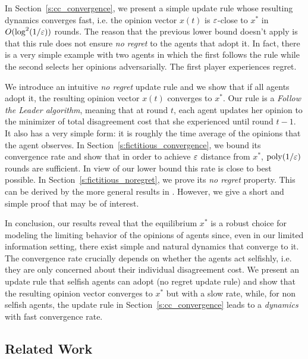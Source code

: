 In Section~\ref{s:cc_convergence}, we present a simple update rule
whose resulting dynamics converges fast, i.e.
the opinion vector $x(t)$ is $\varepsilon$-close to $x^*$ in
$O(\log^2 (1/\varepsilon))$ rounds. The reason that the previous lower
bound doesn't apply is that this rule does not ensure \emph{no regret}
to the agents that adopt it. In fact, there is a very
simple example with two agents in which the first follows the rule
while the second selects her opinions adversarially.  The first player
experiences regret.

We introduce an intuitive \emph{no regret} update rule and we
show that if all agents adopt it, the resulting opinion vector $x(t)$
converges to $x^*$.  Our rule is a \emph{Follow the Leader algorithm}, meaning
that at round $t$, each agent updates her opinion to the minimizer of total
disagreement cost that she experienced until round $t-1$.  It also has a very
simple form: it is roughly the time average of the opinions that the agent
observes.  In Section~\ref{s:fictitious_convergence}, we bound its convergence
rate and show that in order to achieve $\varepsilon$ distance from $x^*$,
$\mathrm{poly}(1/\varepsilon)$ rounds are sufficient.  In view of our lower bound this rate
is close to best possible.  In Section~\ref{s:fictitious_noregret}, we prove its
\emph{no regret} property. This can be derived by the more general results
in \cite{HAK07}.  However, we give a short and simple proof that may be of
interest.

In conclusion, our results reveal that the equilibrium $x^*$ is a robust choice
for modeling the limiting behavior of the opinions of agents since, even in our
limited information setting, there exist simple and natural dynamics that converge
to it.  The convergence rate crucially depends on whether the
agents act selfishly, i.e. they are only concerned about their individual
disagreement cost.
We present an update rule that selfish agents can adopt (no regret update rule)
and show that the resulting opinion vector converges to $x^*$ but with a slow rate,
while, for non selfish agents, the update rule in Section~\ref{s:cc_convergence}
leads to a \emph{dynamics} with fast convergence rate.

\subsection{Related Work}

